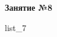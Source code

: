 \documentclass[12pt, a4paper]{article}
\begin{document}
	\begin{center}
		\large
		\textbf{Занятие №8}
	\end{center}
	{list_7}
\end{document}
